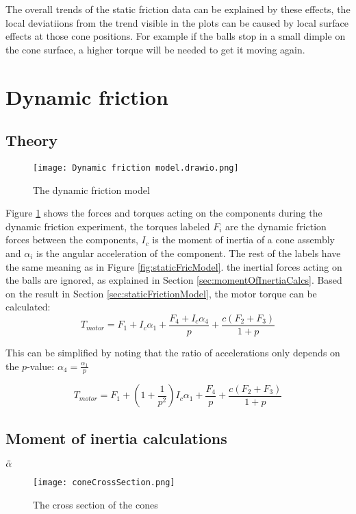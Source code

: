 \documentclass[12pt]{article}
\begin{document}
The overall trends of the static friction data can be explained by these effects, the local deviatiions from the trend visible in the plots can be caused by local surface effects at those cone positions. For example if the balls stop in a small dimple on the cone surface, a higher torque will be needed to get it moving again.



\pagebreak

\section{Dynamic friction}


\subsection{Theory}
\begin{figure}[h]
    \centering
    \texttt{[image: Dynamic friction model.drawio.png]}
    \caption{The dynamic friction model}
    \label{fig:dynFricModel}
\end{figure}
Figure \ref{fig:dynFricModel} shows the forces and torques acting on the components during the dynamic friction experiment, the torques labeled $F_i$ are the dynamic friction forces between the components, $I_c$ is the moment of inertia of a cone assembly and $\alpha_i$ is the angular acceleration of the component. The rest of the labels have the same meaning as in Figure \ref{fig:staticFricModel}. the inertial forces acting on the balls are ignored, as explained in Section \ref{sec:momentOfInertiaCalcs}. 
Based on the result in Section \ref{sec:staticFrictionModel}, the motor torque can be calculated:
$$T_{motor} = F_1 + I_c\alpha_1 + \frac{F_4 + I_c \alpha_4 }{p} + \frac{c(F_2+F_3)}{1+p}$$

This can be simplified by noting that the ratio of accelerations only depends on the $p$-value: $\alpha_4 = \frac{\alpha_1}{p}$

$$T_{motor} = F_1 + \left(1+\frac{1}{p^2}\right)I_c\alpha_1 + \frac{F_4 }{p} + \frac{c(F_2+F_3)}{1+p}$$





\subsection{Moment of inertia calculations}

$\Ddot{\alpha}$

\begin{figure}[h]
    \centering
    \texttt{[image: coneCrossSection.png]}
    \caption{The cross section of the cones}
    \label{fig:coneCrossSection}
\end{figure}
\end{document}
